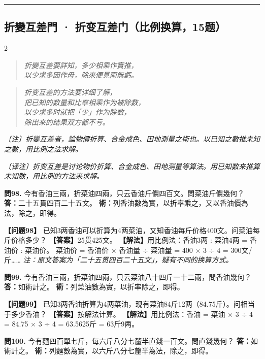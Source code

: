 \documentclass[11pt,a4paper]{article}
\newcommand{\longline}{\noindent\rule{\textwidth}{0.4pt}}
\newcommand{\rhymeCL}[1]{%
  \begin{quote}\itshape\color{verselinecolor}#1\end{quote}
}
\newcommand{\rhymeMOD}[1]{%
  \begin{quote}\itshape\color{verselinecolor}#1\end{quote}
}
\newcommand{\noteCL}[1]{\par\textcolor{notecolor}{\small\textit{〔注〕#1}}\par\smallskip}
\newcommand{\noteMOD}[1]{\par\textcolor{notecolor}{\small\textit{〔译注〕#1}}\par\smallskip}
\begin{document}
\longline

\subsection{折變互差門 · 折变互差门（比例换算，15题）}
\label{sec:zhebian}

\begin{paracol}{2}
\rhymeCL{折變互差要詳知，多少相乘作實推，\\
以少求多因作母，除來便見兩無虧。}
\switchcolumn
\rhymeMOD{折变互差的方法要详细了解，\\
把已知的数量和比率相乘作为被除数，\\
以少求多时就把「少」作为除数，\\
除出来的结果双方都不亏。}
\switchcolumn*
\noteCL{折變互差者，論物價折算、合金成色、田地測量之術也。以已知之數推未知之數，用比例之法求解。}
\switchcolumn
\noteMOD{折变互差是讨论物价折算、合金成色、田地测量等算法。用已知数来推算未知数，用比例的方法来求解。}

\switchcolumn*

\textbf{問98.} 今有香油三兩，折菜油四兩，只云香油斤價四百文。問菜油斤價幾何？\break
\textbf{答：}二十五貫四百二十五文。\break
\textbf{術：}列香油數為實，以折率乘之，又以香油價為法，除之，即得。

\switchcolumn

\textbf{【问题98】} 已知3两香油可以折算为4两菜油，又知香油每斤价格400文。问菜油每斤价格多少？\break
\textbf{【答案】}25贯425文。\break
\textbf{【解法】}用比例法：香油3两 : 菜油4两 = 香油价 : 菜油价。\break
菜油价 = 香油价 × 香油量 ÷ 菜油量 = 400 × 3 ÷ 4 = 300文/斤……\break
\textit{注：原文答案为「二十五贯四百二十五文」，疑有不同的换算方式。}

\switchcolumn*

\textbf{問99.} 今有香油三兩，折菜油四兩，只云菜油八十四斤一十二兩，問香油幾何？\break
\textbf{答：}如術計之。\break
\textbf{術：}列菜油數為實，以折率除之，即得。

\switchcolumn

\textbf{【问题99】} 已知3两香油折算为4两菜油，现有菜油84斤12两（84.75斤）。问相当于多少香油？\break
\textbf{【答案】}按解法计算。\break
\textbf{【解法】}用比例法：香油 = 菜油 × 3 ÷ 4 = 84.75 × 3 ÷ 4 = 63.5625斤 = 63斤9两。

\switchcolumn*

\textbf{問100.} 今有麵四百單七斤，每六斤八分七釐半直錢一百文。問直錢幾何？\break
\textbf{答：}如術計之。\break
\textbf{術：}列麵數為實，以六斤八分七釐半為法，除之，即得。


\end{paracol}
\end{document}

